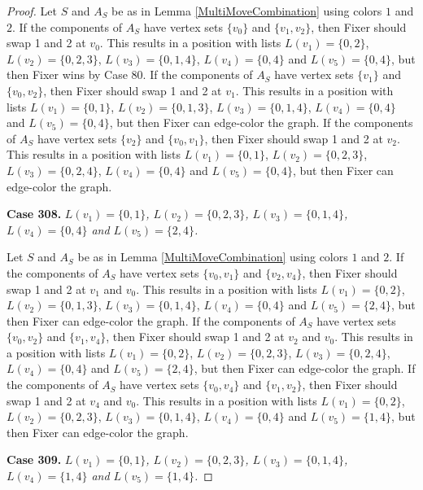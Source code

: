 \documentclass[12pt]{amsart}
\theoremstyle{plain}
\theoremstyle{definition}
\theoremstyle{remark}
\begin{document}
\begin{proof}
Let $S$ and $A_S$ be as in Lemma \ref{MultiMoveCombination} using colors $1$ and $2$. If the components of $A_S$ have vertex sets $\{v_0\}$ and $\{v_1, v_2\}$, then Fixer should swap 1 and 2 at $v_0$. This results in a position with lists $L(v_1) = \{0, 2\}$, $L(v_2) = \{0, 2, 3\}$, $L(v_3) = \{0, 1, 4\}$, $L(v_4) = \{0, 4\}$ and $L(v_5) = \{0, 4\}$, but then Fixer wins by Case 80. If the components of $A_S$ have vertex sets $\{v_1\}$ and $\{v_0, v_2\}$, then Fixer should swap 1 and 2 at $v_1$. This results in a position with lists $L(v_1) = \{0, 1\}$, $L(v_2) = \{0, 1, 3\}$, $L(v_3) = \{0, 1, 4\}$, $L(v_4) = \{0, 4\}$ and $L(v_5) = \{0, 4\}$, but then Fixer can edge-color the graph. If the components of $A_S$ have vertex sets $\{v_2\}$ and $\{v_0, v_1\}$, then Fixer should swap 1 and 2 at $v_2$. This results in a position with lists $L(v_1) = \{0, 1\}$, $L(v_2) = \{0, 2, 3\}$, $L(v_3) = \{0, 2, 4\}$, $L(v_4) = \{0, 4\}$ and $L(v_5) = \{0, 4\}$, but then Fixer can edge-color the graph. 

\noindent\textbf{Case 308.  }\textit{$L(v_1) = \{0, 1\}$, $L(v_2) = \{0, 2, 3\}$, $L(v_3) = \{0, 1, 4\}$, $L(v_4) = \{0, 4\}$ and $L(v_5) = \{2, 4\}$.}

Let $S$ and $A_S$ be as in Lemma \ref{MultiMoveCombination} using colors $1$ and $2$. If the components of $A_S$ have vertex sets $\{v_0, v_1\}$ and $\{v_2, v_4\}$, then Fixer should swap 1 and 2 at $v_1$ and $v_0$. This results in a position with lists $L(v_1) = \{0, 2\}$, $L(v_2) = \{0, 1, 3\}$, $L(v_3) = \{0, 1, 4\}$, $L(v_4) = \{0, 4\}$ and $L(v_5) = \{2, 4\}$, but then Fixer can edge-color the graph. If the components of $A_S$ have vertex sets $\{v_0, v_2\}$ and $\{v_1, v_4\}$, then Fixer should swap 1 and 2 at $v_2$ and $v_0$. This results in a position with lists $L(v_1) = \{0, 2\}$, $L(v_2) = \{0, 2, 3\}$, $L(v_3) = \{0, 2, 4\}$, $L(v_4) = \{0, 4\}$ and $L(v_5) = \{2, 4\}$, but then Fixer can edge-color the graph. If the components of $A_S$ have vertex sets $\{v_0, v_4\}$ and $\{v_1, v_2\}$, then Fixer should swap 1 and 2 at $v_4$ and $v_0$. This results in a position with lists $L(v_1) = \{0, 2\}$, $L(v_2) = \{0, 2, 3\}$, $L(v_3) = \{0, 1, 4\}$, $L(v_4) = \{0, 4\}$ and $L(v_5) = \{1, 4\}$, but then Fixer can edge-color the graph. 

\noindent\textbf{Case 309.  }\textit{$L(v_1) = \{0, 1\}$, $L(v_2) = \{0, 2, 3\}$, $L(v_3) = \{0, 1, 4\}$, $L(v_4) = \{1, 4\}$ and $L(v_5) = \{1, 4\}$.}


\end{proof}
\end{document}

